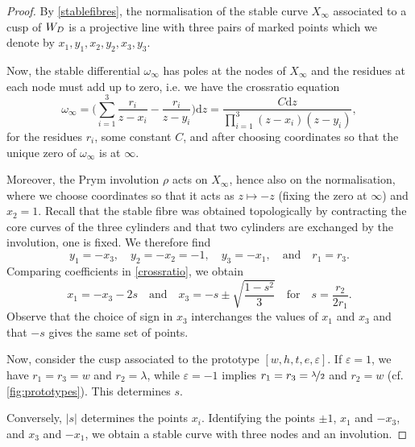 \documentclass{amsart}
\renewcommand{\d}[1]{\mathrm{d}#1}
\def\ep{\varepsilon}
\def\abs#1{\lvert#1\rvert}
\begin{document}
\begin{proof}
By \autoref{stablefibres}, the normalisation of the stable curve $X_\infty$ associated to a cusp of $\W$ is a projective line with three pairs of marked points which we denote by $x_1,y_1,x_2,y_2,x_3,y_3$. 

Now, the stable differential $\omega_\infty$ has poles at the nodes of $X_\infty$ and the residues at each node must add up to zero, i.e. we have the crossratio equation
\begin{equation}\label{crossratio}
\omega_\infty=\biggl(\sum_{i=1}^3\frac{r_i}{z-x_i}-\frac{r_i}{z-y_i}\biggr)\d z=\frac{C \d z}{\displaystyle\prod_{i=1}^3 (z-x_i)(z-y_i)},
\end{equation}
for the residues $r_i$, some constant $C$, and after choosing coordinates so that the unique zero of $\omega_\infty$ is at $\infty$.

Moreover, the Prym involution $\rho$ acts on $X_\infty$, hence also on the normalisation, where we choose coordinates so that it acts as $z\mapsto -z$ (fixing the zero at $\infty$) and $x_2=1$. Recall that the stable fibre was obtained topologically by contracting the core curves of the three cylinders and that two cylinders are exchanged by the involution, one is fixed. We therefore find
\[y_1=-x_3,\quad y_2=-x_2=-1,\quad y_3=-x_1,\quad\text{and}\quad r_1=r_3.\]
Comparing coefficients in \eqref{crossratio}, we obtain
\[x_1=-x_3-2s\quad\text{and}\quad x_3=-s\pm\sqrt{\frac{1-s^2}{3}}\quad\text{for}\quad s=\frac{r_2}{2r_1}.\]
Observe that the choice of sign in $x_3$ interchanges the values of $x_1$ and $x_3$ and that $-s$ gives the same set of points.

Now, consider the cusp associated to the prototype $[w,h,t,e,\ep]$. If $\ep=1$, we have $r_1=r_3=w$ and $r_2=\lambda$, while $\ep=-1$ implies $r_1=r_3=\nicefrac{\lambda}{2}$ and $r_2=w$ (cf. \autoref{fig:prototypes}). This determines $s$.

Conversely, $\abs{s}$ determines the points $x_i$. Identifying the points $\pm 1$, $x_1$ and $-x_3$, and $x_3$ and $-x_1$, we obtain a stable curve with three nodes and an involution.
%
\end{proof}
\end{document}

